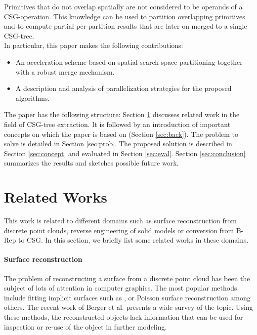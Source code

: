 Primitives that do not overlap spatially are not considered to be operands of a \ac{CSG}-operation.
This knowledge can be used to partition overlapping primitives and to compute partial per-partition results that are later on merged to a single \ac{CSG}-tree. 
\\
In particular, this paper makes the following contributions:
\begin{itemize}
\item An acceleration scheme based on spatial search space partitioning together with a robust merge mechanism.
\item A description and analysis of parallelization strategies for the proposed algorithms.
\end{itemize}  
The paper has the following structure: 
Section \ref{sec:relworks} discusses related work in the field of \ac{CSG}-tree extraction.
It is followed by an introduction of important concepts on which the paper is based on (Section \ref{sec:back}).
The problem to solve is detailed in Section \ref{sec:prob}.
The proposed solution is described in Section \ref{sec:concept} and evaluated in Section \ref{sec:eval}.
Section \ref{sec:conclusion} summarizes the results and sketches possible future work.
 
\copyrightspace

\section{Related Works}
\label{sec:relworks}
This work is related to different domains such as surface reconstruction from discrete point clouds, reverse engineering of solid models or conversion from B-Rep to CSG. 
In this section, we briefly list some related works in these domains. 

\paragraph{Surface reconstruction}
The problem of reconstructing a surface from a discrete point cloud has been the subject of lots of attention in computer graphics. 
The most popular methods include fitting implicit surfaces such as \cite{OBATS03}, or Poisson surface reconstruction \cite{KH13} among others. 
The recent work of Berger et al. \cite{berger2017survey} presents a wide survey of the topic.
Using these methods, the reconstructed objects lack information that can be used for inspection or re-use of the object in further modeling. 

